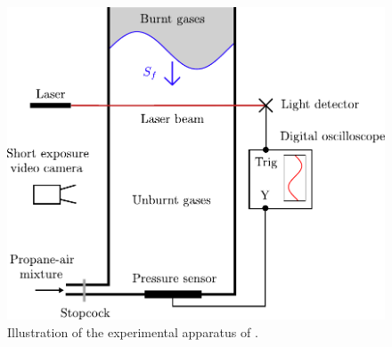 \begin{figure}[t]
\centering
\includegraphics[scale=0.6]{assets/imgs/Searby-92.pdf}
\caption{Illustration of the experimental apparatus of \cite{searby1992AcousticInstabilityPremixed}.}
\label{fig:searby-experiment}
\end{figure}

